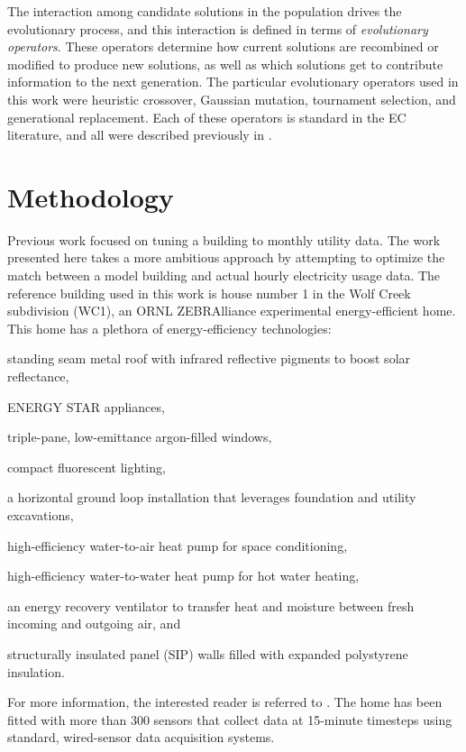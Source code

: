 \documentclass[preprint, review, 12pt]{elsarticle}
\begin{document}
The interaction among candidate solutions in the population drives the evolutionary process, and this interaction is defined in terms of \emph{evolutionary operators}. These operators determine how current solutions are recombined or modified to produce new solutions, as well as which solutions get to contribute information to the next generation. The particular evolutionary operators used in this work were heuristic crossover, Gaussian mutation, tournament selection, and generational replacement. Each of these operators is standard in the EC literature, and all were described previously in \cite{cit:garrett2013}.


\section{Methodology}
\label{sec:methodology}
Previous work \cite{cit:garrett2013} focused on tuning a building to monthly utility data. The work presented here takes a more ambitious approach by attempting to optimize the match between a model building and actual hourly electricity usage data. The reference building used in this work is house number 1 in the Wolf Creek subdivision (WC1), an ORNL ZEBRAlliance experimental energy-efficient home. This home has a plethora of energy-efficiency technologies: 
\begin{inparaenum}[(1)]
\item standing seam metal roof with infrared reflective pigments to boost solar reflectance,
\item ENERGY STAR appliances, 
\item triple-pane, low-emittance argon-filled windows, 
\item compact fluorescent lighting, 
\item a horizontal ground loop installation that leverages foundation and utility excavations, 
\item high-efficiency water-to-air heat pump for space conditioning, 
\item high-efficiency water-to-water heat pump for hot water heating, 
\item an energy recovery ventilator to transfer heat and moisture between fresh incoming and outgoing air, and 
\item structurally insulated panel (SIP) walls filled with expanded polystyrene insulation.
\end{inparaenum}
For more information, the interested reader is referred to \cite{cit:miller2012,cit:biswas2012}. The home has been fitted with more than 300 sensors that collect data at 15-minute timesteps using standard, wired-sensor data acquisition systems.
\end{document}

